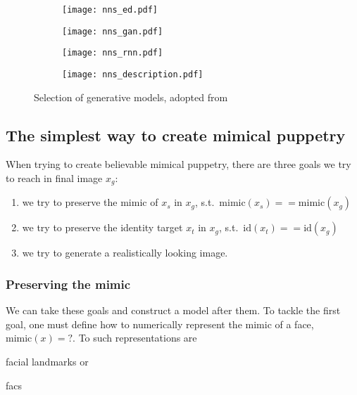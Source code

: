 \begin{figure}[htp]
    \captionsetup[subfigure]{justification=centering}
    \centering
    \begin{minipage}[s][3.3cm]{.23\columnwidth}
        \begin{subfigure}{\columnwidth}
            \texttt{[image: nns\_ed.pdf]}
            \caption{}\label{subfig:ed}
        \end{subfigure}
        \vfil
        \begin{subfigure}{\columnwidth}
            \texttt{[image: nns\_gan.pdf]}
            \caption{}\label{subfig:gan}
        \end{subfigure}
    \end{minipage}
    \begin{subfigure}{.2\columnwidth}
        \texttt{[image: nns\_rnn.pdf]}
        \caption{}\label{subfig:rnn}
    \end{subfigure}
    \begin{minipage}[s][3.7cm]{.17\columnwidth}
        \begin{subfigure}{\columnwidth}
            \texttt{[image: nns\_description.pdf]}
        \end{subfigure}\vfil
    \end{minipage}
    \caption{Selection of generative models, adopted from~\cite{Mirsky.2020}}\label{fig:generative-models}
\end{figure}
\subsection{The simplest way to create mimical puppetry}
When trying to create believable mimical puppetry, there are three goals
we try to reach in final image \(x_g\):
\begin{enumerate}[1.)]
    \item we try to preserve the mimic of \(x_s\) in \(x_g\), s.t.\ \(\text{mimic}(x_s)==\text{mimic}(x_g)\)
    \item we try to preserve the identity target \(x_t\) in \(x_g\), s.t.\ \(\text{id}(x_t)==\text{id}(x_g)\)
    \item we try to generate a realistically looking image.
\end{enumerate}
\subsubsection{Preserving the mimic}
We can take these goals and construct a model after them. To tackle the first
goal, one must define how to numerically represent the mimic of a face, \(\text{mimic}(x)=\mathord{?}\).
To such representations are
\begin{enumerate*}[a.)]
    \item facial landmarks or
    \item \gls{facs}
\end{enumerate*}
